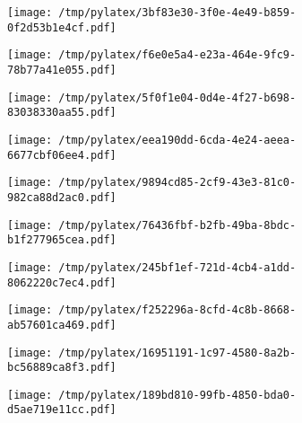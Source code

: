 \documentclass{article}
\begin{document}
\begin{figure}[htbp]
\begin{subfigure}[b]{.3\linewidth}
\texttt{[image: /tmp/pylatex/3bf83e30-3f0e-4e49-b859-0f2d53b1e4cf.pdf]}
\end{subfigure}
\begin{subfigure}[b]{.3\linewidth}
\texttt{[image: /tmp/pylatex/f6e0e5a4-e23a-464e-9fc9-78b77a41e055.pdf]}
\end{subfigure}
\begin{subfigure}[b]{.3\linewidth}
\texttt{[image: /tmp/pylatex/5f0f1e04-0d4e-4f27-b698-83038330aa55.pdf]}
\end{subfigure}
\begin{subfigure}[b]{.3\linewidth}
\texttt{[image: /tmp/pylatex/eea190dd-6cda-4e24-aeea-6677cbf06ee4.pdf]}
\end{subfigure}
\begin{subfigure}[b]{.3\linewidth}
\texttt{[image: /tmp/pylatex/9894cd85-2cf9-43e3-81c0-982ca88d2ac0.pdf]}
\end{subfigure}
\begin{subfigure}[b]{.3\linewidth}
\texttt{[image: /tmp/pylatex/76436fbf-b2fb-49ba-8bdc-b1f277965cea.pdf]}
\end{subfigure}
\begin{subfigure}[b]{.3\linewidth}
\texttt{[image: /tmp/pylatex/245bf1ef-721d-4cb4-a1dd-8062220c7ec4.pdf]}
\end{subfigure}
\begin{subfigure}[b]{.3\linewidth}
\texttt{[image: /tmp/pylatex/f252296a-8cfd-4c8b-8668-ab57601ca469.pdf]}
\end{subfigure}
\begin{subfigure}[b]{.3\linewidth}
\texttt{[image: /tmp/pylatex/16951191-1c97-4580-8a2b-bc56889ca8f3.pdf]}
\end{subfigure}
\begin{subfigure}[b]{.3\linewidth}
\texttt{[image: /tmp/pylatex/189bd810-99fb-4850-bda0-d5ae719e11cc.pdf]}
\end{subfigure}
\end{figure}
\end{document}
